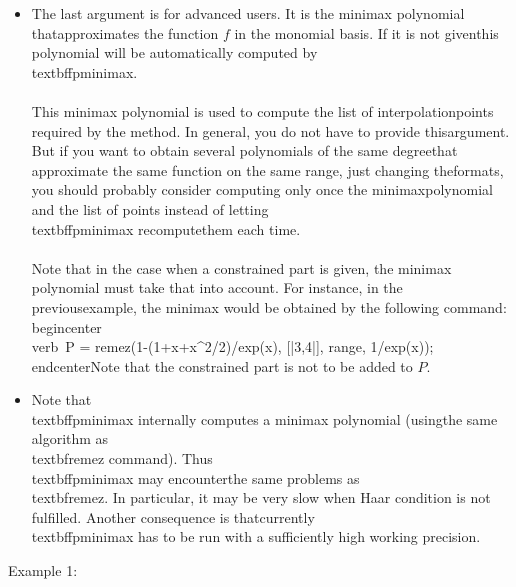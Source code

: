 \begin{itemize}
\item The last argument is for advanced users. It is the minimax polynomial that\n   approximates the function $f$ in the monomial basis. If it is not given\n   this polynomial will be automatically computed by \\textbf{fpminimax}.\n   \\\\\n   This minimax polynomial is used to compute the list of interpolation\n   points required by the method. In general, you do not have to provide this\n   argument. But if you want to obtain several polynomials of the same degree\n   that approximate the same function on the same range, just changing the\n   formats, you should probably consider computing only once the minimax\n   polynomial and the list of points instead of letting \\textbf{fpminimax} recompute\n   them each time.\n   \\\\\n   Note that in the case when a constrained part is given, the minimax \n   polynomial must take that into account. For instance, in the previous\n   example, the minimax would be obtained by the following command:\n          \\begin{center}\\verb~P = remez(1-(1+x+x^2/2)/exp(x), [|3,4|], range, 1/exp(x));~\\end{center}\n   Note that the constrained part is not to be added to $P$.\n
\item Note that \\textbf{fpminimax} internally computes a minimax polynomial (using\n   the same algorithm as \\textbf{remez} command). Thus \\textbf{fpminimax} may encounter\n   the same problems as \\textbf{remez}. In particular, it may be very slow \n   when Haar condition is not fulfilled. Another consequence is that\n   currently \\textbf{fpminimax} has to be run with a sufficiently high working precision.\n\end{itemize}
\noindent Example 1: 
\begin{center}\begin{minipage}{15cm}\begin{Verbatim}[frame=single]
\end{Verbatim}
\end{minipage}\end{center}
